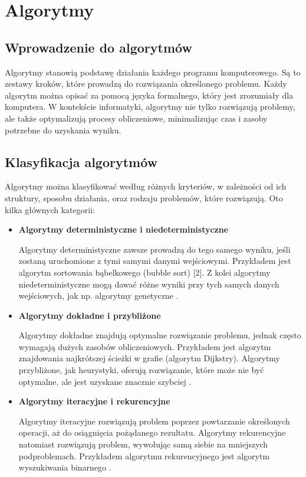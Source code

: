 \newpage %
\section{Algorytmy}
\subsection{Wprowadzenie do algorytmów}

Algorytmy stanowią podstawę działania każdego programu komputerowego. Są to zestawy kroków, które prowadzą do rozwiązania określonego problemu. Każdy algorytm można opisać za pomocą języka formalnego, który jest zrozumiały dla komputera. W kontekście informatyki, algorytmy nie tylko rozwiązują problemy, ale także optymalizują procesy obliczeniowe, minimalizując czas i zasoby potrzebne do uzyskania wyniku\cite{algorithms}.

\subsection{Klasyfikacja algorytmów}

Algorytmy można klasyfikować według różnych kryteriów, w zależności od ich struktury, sposobu działania, oraz rodzaju problemów, które rozwiązują. Oto kilka głównych kategorii:

\begin{itemize}
    \item{\textbf{Algorytmy deterministyczne i niedeterministyczne}}
    
    Algorytmy deterministyczne zawsze prowadzą do tego samego wyniku, jeśli zostaną uruchomione z tymi samymi danymi wejściowymi. Przykładem jest algorytm sortowania bąbelkowego (bubble sort) [2]. Z kolei algorytmy niedeterministyczne mogą dawać różne wyniki przy tych samych danych wejściowych, jak np. algorytmy genetyczne \cite{cohen1979non}.
    
    \item{\textbf{Algorytmy dokładne i przybliżone}}
    
    Algorytmy dokładne znajdują optymalne rozwiązanie problemu, jednak często wymagają dużych zasobów obliczeniowych. Przykładem jest algorytm znajdowania najkrótszej ścieżki w grafie (algorytm Dijkstry). Algorytmy przybliżone, jak heurystyki, oferują rozwiązanie, które może nie być optymalne, ale jest uzyskane znacznie szybciej \cite{trevisan}.
    
    \item{\textbf{Algorytmy iteracyjne i rekurencyjne}}

    Algorytmy iteracyjne rozwiązują problem poprzez powtarzanie określonych operacji, aż do osiągnięcia pożądanego rezultatu. Algorytmy rekurencyjne natomiast rozwiązują problem, wywołując samą siebie na mniejszych podproblemach. Przykładem algorytmu rekurencyjnego jest algorytm wyszukiwania binarnego \cite{recursiveVsIterative}.
    
\end{itemize}

